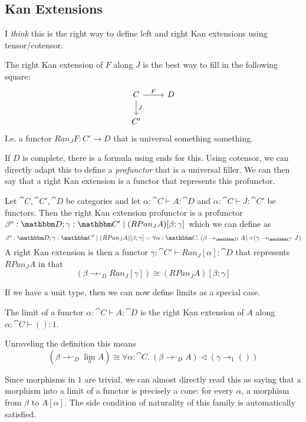 \documentclass{article}
\begin{document}
\subsection{Kan Extensions}

I \emph{think} this is the right way to define left and right Kan
extensions using tensor/cotensor.

The right Kan extension of $F$ along $J$ is the best way to fill in the following square:
\[%
\begin{tikzcd}
C \arrow[d, "J"] \arrow[r, "F"] & D \\
C'                              &  
\end{tikzcd}\]
I.e. a functor $Ran_J F : C' \to D$ that is universal something something.

If $D$ is complete, there is a formula using ends for this. Using
cotensor, we can directly adapt this to define a \emph{profunctor}
that is a universal filler. We can then say that a right Kan extension
is a functor that represents this profunctor.

\begin{definition}
  Let $\cat C, \cat C', \cat D$ be categories and let $\alpha : \cat C
  \vdash A : \cat D$ and $\alpha : \cat C \vdash J : \cat C'$ be
  functors. Then the right Kan extension profunctor is a profunctor
  $\beta^o:\cat D; \gamma:\cat C' \pipe (RPan_J A)[\beta;\gamma]$ which we can define as
  \[ \beta^o:\cat D; \gamma:\cat C' \pipe (RPan_J A)[\beta;\gamma] = \forall \alpha:\cat C.~ (\beta \to_{\cat D} A) \triangleleft (\gamma \to_{\cat C'} J)
  \]
  A right Kan extension is then a functor $\gamma:\cat C' \vdash
  Ran_J[\alpha] : \cat D$ that represents $RPan_J A$ in that
  \[ (\beta \to_{\cat D} Ran_J[\gamma]) \cong (RPan_J A)[\beta;\gamma] \]
\end{definition}

If we have a unit type, then we can now define limits as a special
case.
\begin{definition}
  The limit of a functor $\alpha : \cat C \vdash A : \cat D$ is the
  right Kan extension of $A$ along $\alpha : \cat C \vdash () : 1$.

  Unraveling the definition this means
  \[ (\beta \to_{\cat D} \lim_\alpha A) \cong \forall \alpha:\cat C.~ (\beta \to_{\cat D} A) \triangleleft (\gamma \to_{1} ()) \]
\end{definition}
Since morphisms in $1$ are trivial, we can almost directly read this
as saying that a morphism into a limit of a functor is precisely a
cone: for every $\alpha$, a morphism from $\beta$ to $A[\alpha]$. The
side condition of naturality of this family is automatically
satisfied.
\end{document}
